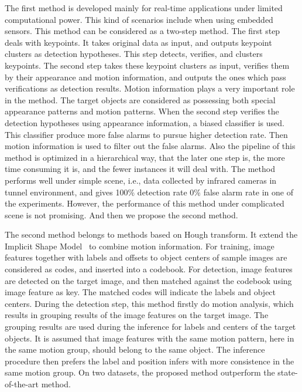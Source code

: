  The first method is developed mainly for real-time applications under limited computational power. This kind of scenarios include when using embedded sensors. This method can be considered as a two-step method. The first step deals with keypoints. It
takes original data as input, and outputs keypoint clusters as detection hypotheses. This step detects, verifies, and clusters keypoints. The second
step takes these keypoint clusters as input, verifies them by their appearance and motion
information, and outputs the ones which pass verifications as detection results. Motion information plays a very important role in the method. The target objects are considered as possessing both special appearance patterns and motion patterns. When the second step verifies the detection hypotheses using appearance information, a biased classifier is used. This classifier produce more false alarms to pursue higher detection rate. Then motion information is used to filter out the false alarms. Also the pipeline of this method is optimized in a hierarchical way, that the later one step is, the more time consuming it is, and the fewer instances it will deal with. The method performs well under simple scene, i.e., data collected by infrared cameras in tunnel environment, and gives 100\% detection rate 0\% false alarm rate in one of the experiments. However, the performance of this method under complicated scene is not promising. And then we propose the second method.

The second method belongs to methods based on Hough transform. It extend the Implicit Shape Model~\citep{lb1} to combine motion information. For training, image features together with labels and offsets to object centers of sample images are considered as codes, and inserted into a codebook. For detection, image features are detected on the target image, and then matched against the codebook using image feature as key. The matched codes will indicate the labels and object centers. During the detection step, this method firstly do motion analysis, which results in grouping results of the image features on the target image. The grouping results are used during the inference for labels and centers of the target objects. It is assumed that image features with the same motion pattern, here in the same motion group, should belong to the same object. The inference procedure then prefers the label and position infers with more consistence in the same motion group. On two datasets, the proposed method outperform the state-of-the-art method.

